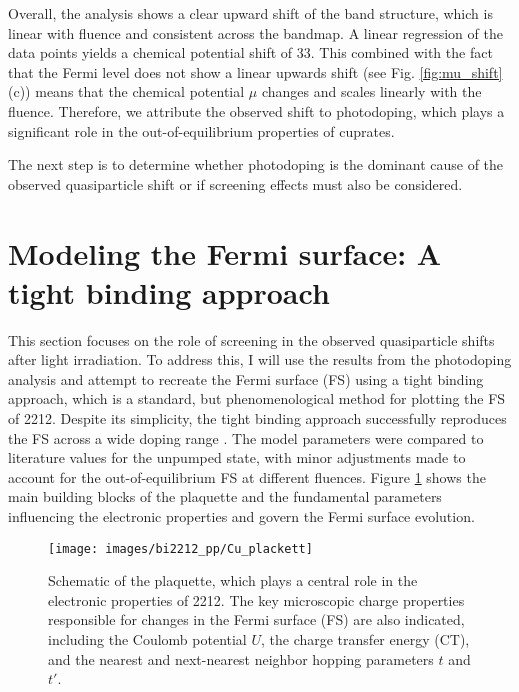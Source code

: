 Overall, the analysis shows a clear upward shift of the band structure, which is linear with fluence and consistent across the bandmap.
A linear regression of the data points yields a chemical potential shift of \qty{33}{\frac{\milli\electronvolt}{\milli\joule/\centi\meter\squared}}.
This combined with the fact that the Fermi level does not show a linear upwards shift (see Fig. \ref{fig:mu_shift} (c)) means that the chemical potential $\mu$ changes and scales linearly with the fluence.
Therefore, we attribute the observed shift to photodoping, which plays a significant role in the out-of-equilibrium properties of cuprates.

The next step is to determine whether photodoping is the dominant cause of the observed quasiparticle shift or if screening effects must also be considered.

\section{Modeling the Fermi surface: A tight binding approach}
\label{sec:tb}

This section focuses on the role of screening in the observed quasiparticle shifts after light irradiation.
To address this, I will use the results from the photodoping analysis and attempt to recreate the Fermi surface (FS) using a tight binding approach, which is a standard, but phenomenological method for plotting the FS of 2212.
Despite its simplicity, the tight binding approach successfully reproduces the FS across a wide doping range \cite{markiewicz_one-band_2005}.
The model parameters were compared to literature values for the unpumped state, with minor adjustments made to account for the out-of-equilibrium FS at different fluences.
Figure \ref{fig:cuplackett} shows the main building blocks of the  plaquette and the fundamental parameters influencing the electronic properties and govern the Fermi surface evolution.

\begin{figure}[b!]
	\centering
	\texttt{[image: images/bi2212\_pp/Cu\_plackett]}
	\caption{Schematic of the  plaquette, which plays a central role in the electronic properties of 2212. The key microscopic charge properties responsible for changes in the Fermi surface (FS) are also indicated, including the Coulomb potential $U$, the charge transfer energy (CT), and the nearest and next-nearest neighbor hopping parameters $t$ and $t'$.}
	\label{fig:cuplackett}
\end{figure}

